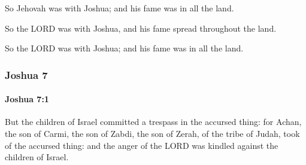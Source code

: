 			\begin{versebox}
					\item[BHS] 
					\item[ASV] So Jehovah was with Joshua; and his fame was in all the land.
					\item[NIV] So the LORD was with Joshua, and his fame spread throughout the land.
					\item[NRSV] So the LORD was with Joshua; and his fame was in all the land.
			\end{versebox}
	\subsubsection{Joshua 7} %
		\label{JOSHUA-7}

		\paragraph{Joshua 7:1} %
			\label{JOSHUA-7-1}

			But the children of Israel committed a trespass in the accursed thing: for Achan, the son of Carmi, the son of Zabdi, the son of Zerah, of the tribe of Judah, took of the accursed thing: and the anger of the LORD was kindled against the children of Israel.

